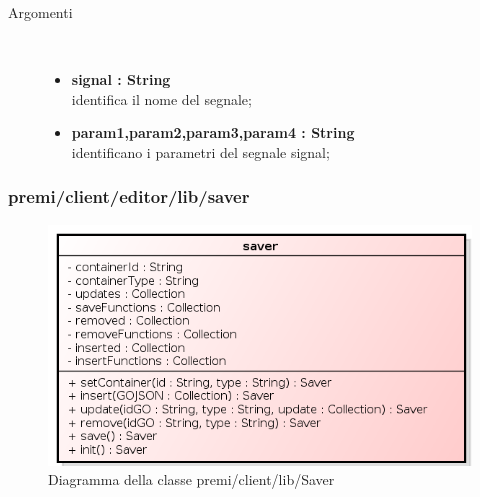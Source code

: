 \begin{description}
\begin{description}
		\begin{description}
			\item[Argomenti] \hfill \\
				\begin{itemize}
				
					\item \textbf{signal : String			} \hfill \\
					identifica il nome del segnale;
					\item \textbf{param1,param2,param3,param4 : String			} \hfill \\
					identificano i parametri del segnale signal;			
				\end{itemize}
		\end{description}
	\end{description}		
	
	
\end{description}

\subsubsection{premi/client/editor/lib/saver}
\begin{figure}[h]
\begin{center}
\includegraphics[scale=0.90]{img/diacla/Saver.png}
\caption{Diagramma della classe premi/client/lib/Saver}
\end{center}
\end{figure} 
 
